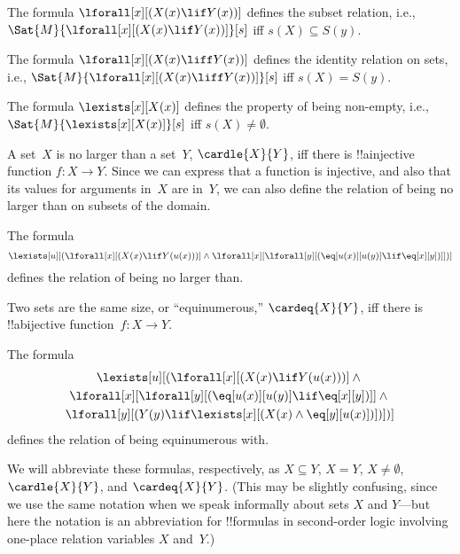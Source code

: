 \documentclass[../../../include/open-logic-section]{subfiles}
\begin{document}


\begin{prop}
The formula $\lforall[x][(X(x) \lif Y(x))]$ defines the subset
relation, i.e., $\Sat{M}{\lforall[x][(X(x) \lif Y(x))]}[s]$ iff $s(X)
\subseteq S(y)$.
\end{prop}

\begin{prop}
The formula $\lforall[x][(X(x) \liff Y(x))]$ defines the identity
relation on sets, i.e., $\Sat{M}{\lforall[x][(X(x) \liff Y(x))]}[s]$
iff $s(X) = S(y)$.
\end{prop}

\begin{prop}
The formula $\lexists[x][X(x)]$ defines the property of being
non-empty, i.e., $\Sat{M}{\lexists[x][X(x)]}[s]$ iff $s(X) \neq
\emptyset$.
\end{prop}

A set~$X$ is no larger than a set~$Y$, $\cardle{X}{Y}$, iff there is
!!a{injective} function $f\colon X \to Y$.  Since we can express that
a function is injective, and also that its values for arguments in~$X$
are in~$Y$, we can also define the relation of being no larger than on
subsets of the domain.

\begin{prop}
The formula
\[
\lexists[u][(\lforall[x][(X(x) \lif Y(u(x)))] \land \lforall[x][\lforall[y][(\eq[u(x)][u(y)] \lif
      \eq[x][y])]])]
\]
defines the relation of being no larger than.
\end{prop}

Two sets are the same size, or ``equinumerous,'' $\cardeq{X}{Y}$, iff
there is !!a{bijective} function~$f\colon X \to Y$.

\begin{prop}
The formula
\begin{multline*}
  \lexists[u][(\lforall[x][(X(x) \lif Y(u(x)))] \land {}\\
    \lforall[x][\lforall[y][(\eq[u(x)][u(y)] \lif \eq[x][y])]]
  \land {} \\\lforall[y][(Y(y) \lif \lexists[x][(X(x)
      \land \eq[y][u(x)])])])]
\end{multline*}
defines the relation of being equinumerous with.
\end{prop}

We will abbreviate these formulas, respectively, as $X \subseteq Y$,
$X = Y$, $X \neq \emptyset$, $\cardle{X}{Y}$, and
$\cardeq{X}{Y}$. (This may be slightly confusing, since we use the
same notation when we speak informally about sets $X$ and $Y$---but
here the notation is an abbreviation for !!{formula}s in second-order
logic involving one-place relation variables $X$ and~$Y$.)
\end{document}
